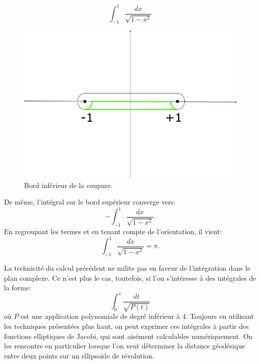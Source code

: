 \[
 \int_{-1}^1 \frac{dx}{\sqrt{1-x^2}}
\]
\begin{figure}
    \centering
    \includegraphics[scale=0.6]{images/contour_racine_bords.png}
    \caption{Bord inférieur de la coupure.}
    \label{fig:racine_bords}
\end{figure}
De même, l'intégral sur le bord supérieur converge vers:
\[
- \int_{-1}^1 \frac{dx}{\sqrt{1-x^2}}.
\] 
En regroupant les termes et en tenant compte de l'orientation, il vient:
\[
\int_{-1}^1 \frac{dx}{\sqrt{1-x^2}} = \pi.
\]
\begin{rem}
La technicité du calcul précédent ne milite pas en faveur de l'intégration dans le plan complexe. Ce n'est plus le cas, toutefois, si l'on s'intéresse à des intégrales de la forme:
\[
\int_0^x \frac{dt}{\sqrt{P(t)}}
\]
où $P$ est une application polynomiale de degré inférieur à $4.$
Toujours en utilisant les techniques présentées plus haut, on peut exprimer ces intégrales à partir des fonctions elliptiques de Jacobi, qui sont aisément calculables numériquement. On les rencontre en particulier lorsque l'on veut déterminer la distance géodésique entre deux points sur un ellipsoïde de révolution.
\end{rem}
